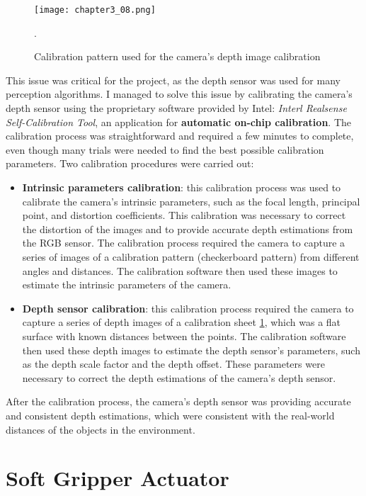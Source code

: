 \begin{figure}[t]
    \centering
    \texttt{[image: chapter3\_08.png]}
    \captionsetup{width=1\linewidth}
    \caption{Calibration pattern used for the camera's depth image calibration}.
    \label{fig:c3_img08}
\end{figure}

This issue was critical for the project, as the depth sensor was used for many perception algorithms.
I managed to solve this issue by calibrating the camera's depth sensor using the proprietary software provided by Intel:
\textit{Interl Realsense Self-Calibration Tool}, an application for \textbf{automatic on-chip calibration}.
The calibration process was straightforward and required a few minutes to complete, even though many trials were needed
to find the best possible calibration parameters. Two calibration procedures were carried out:

\begin{itemize}
    \item \textbf{Intrinsic parameters calibration}: this calibration process was used to calibrate the camera's 
    intrinsic parameters,
    such as the focal length, principal point, and distortion coefficients. This calibration was necessary to correct
    the distortion of the images and to provide accurate depth estimations from the RGB sensor. The calibration process
    required the camera to capture a series of images of a calibration pattern (checkerboard pattern) from different angles
    and distances. The calibration software then used these images to estimate the intrinsic parameters of the camera.
    \item \textbf{Depth sensor calibration}: this calibration process required the camera to capture a series of
    depth images of a calibration sheet \ref{fig:c3_img08}, which was a flat surface with known distances between the points.
    The calibration software then used these depth images to estimate the depth sensor's parameters, 
    such as the depth scale factor and the depth offset. 
    These parameters were necessary to correct the depth estimations of the camera's depth sensor.
\end{itemize}


After the calibration process, the camera's depth sensor was providing accurate and consistent depth estimations,
which were consistent with the real-world distances of the objects in the environment.

\section{Soft Gripper Actuator}


